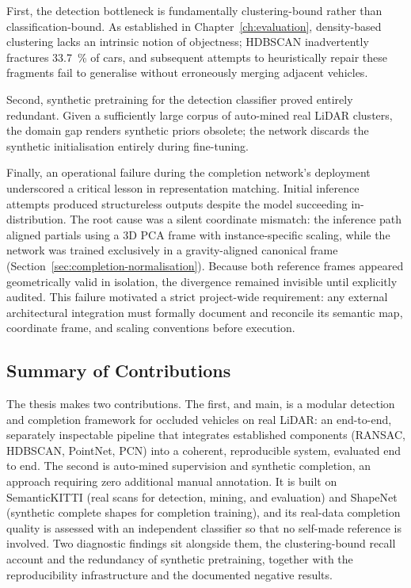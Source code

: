 First, the detection bottleneck is fundamentally clustering-bound rather than classification-bound.
As established in Chapter~\ref{ch:evaluation}, density-based clustering lacks an intrinsic
notion of objectness; HDBSCAN inadvertently fractures \SI{33.7}{\percent} of cars, and subsequent
attempts to heuristically repair these fragments fail to generalise without erroneously merging
adjacent vehicles.

Second, synthetic pretraining for the detection classifier proved entirely redundant. Given a
sufficiently large corpus of auto-mined real LiDAR clusters, the domain gap renders synthetic
priors obsolete; the network discards the synthetic initialisation entirely during fine-tuning.

Finally, an operational failure during the completion network's deployment underscored a critical
lesson in representation matching. Initial inference attempts produced structureless outputs
despite the model succeeding in-distribution. The root cause was a silent coordinate mismatch: the
inference path aligned partials using a 3D PCA frame with instance-specific scaling, while the
network was trained exclusively in a gravity-aligned canonical frame (Section~\ref{sec:completion-normalisation}).
Because both reference frames appeared geometrically valid in isolation, the
divergence remained invisible until explicitly audited. This failure motivated a strict project-wide
requirement: any external architectural integration must formally document and reconcile its
semantic map, coordinate frame, and scaling conventions before execution.

\subsection{Summary of Contributions}
The thesis makes two contributions. The first, and main, is a modular
detection and completion framework for occluded vehicles on real LiDAR: an end-to-end,
separately inspectable pipeline that integrates established components (RANSAC, HDBSCAN,
PointNet, PCN) into a coherent, reproducible system, evaluated end to end. The second is
auto-mined supervision and synthetic completion, an approach requiring zero additional
manual annotation. It is built on SemanticKITTI (real scans for detection, mining, and
evaluation) and ShapeNet (synthetic complete shapes for completion training), and its
real-data completion quality is assessed with an independent classifier so that no
self-made reference is involved. Two diagnostic findings sit alongside
them, the clustering-bound recall account and the redundancy of synthetic pretraining,
together with the reproducibility infrastructure and the documented negative results.

